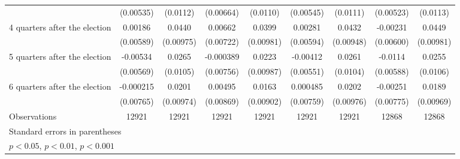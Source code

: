 \begin{table}[htbp]
\begin{tabular}{l*{8}{c}}
                    &   (0.00535)         &    (0.0112)         &   (0.00664)         &    (0.0110)         &   (0.00545)         &    (0.0111)         &   (0.00523)         &    (0.0113)         \\
[1em]
 4 quarters after the election&     0.00186         &      0.0440\sym{***}&     0.00662         &      0.0399\sym{***}&     0.00281         &      0.0432\sym{***}&    -0.00231         &      0.0449\sym{***}\\
                    &   (0.00589)         &   (0.00975)         &   (0.00722)         &   (0.00981)         &   (0.00594)         &   (0.00948)         &   (0.00600)         &   (0.00981)         \\
[1em]
 5 quarters after the election&    -0.00534         &      0.0265\sym{*}  &   -0.000389         &      0.0223\sym{*}  &    -0.00412         &      0.0261\sym{*}  &     -0.0114         &      0.0255\sym{*}  \\
                    &   (0.00569)         &    (0.0105)         &   (0.00756)         &   (0.00987)         &   (0.00551)         &    (0.0104)         &   (0.00588)         &    (0.0106)         \\
[1em]
 6 quarters after the election&   -0.000215         &      0.0201\sym{*}  &     0.00495         &      0.0163         &    0.000485         &      0.0202\sym{*}  &    -0.00251         &      0.0189         \\
                    &   (0.00765)         &   (0.00974)         &   (0.00869)         &   (0.00902)         &   (0.00759)         &   (0.00976)         &   (0.00775)         &   (0.00969)         \\
\hline
Observations        &       12921         &       12921         &       12921         &       12921         &       12921         &       12921         &       12868         &       12868         \\
\hline\hline
\multicolumn{9}{l}{\footnotesize Standard errors in parentheses}\\
\multicolumn{9}{l}{\footnotesize \sym{*} \(p<0.05\), \sym{**} \(p<0.01\), \sym{***} \(p<0.001\)}\\
\end{tabular}
\end{table}
